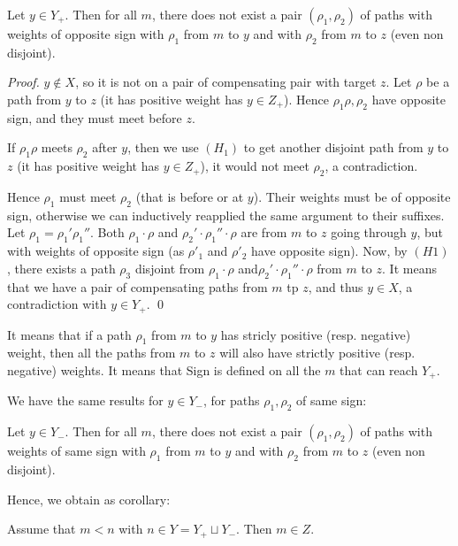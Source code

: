 			
\begin{lemma}
	\label{lemma10}
		Let $y \in Y_+$. Then for all $m$, there does not exist a pair $(\rho_1,\rho_2)$ 
		of paths  with weights of opposite sign with $\rho_1$ from $m$ to $y$ and 
		with $\rho_2$ from $m$ to $z$ (even non disjoint).
\end{lemma}

\begin{proof}
  $y \notin X$, so it is not on a pair of compensating pair with target $z$.
  Let $\rho$ be a path from $y$ to $z$ (it has positive weight has $y \in Z_+$).
  Hence $\rho_1 \rho, \rho_2$ have opposite sign, and they must meet before $z$.

  If $\rho_1 \rho$ meets $\rho_2$ after $y$, then we use $(H_1)$ to get another disjoint path from $y$ to $z$ (it has positive weight has $y \in Z_+$), it would not meet $\rho_2$, a contradiction.

  Hence $\rho_1$ must meet $\rho_2$ (that is before or at $y$).
  Their weights must be of opposite sign, otherwise we can inductively reapplied the same argument to their suffixes.
  Let $\rho_1=\rho_1'\rho_1''$.
  Both $\rho_1 \cdot \rho$ and $\rho_2' \cdot \rho_1'' \cdot \rho$
  are from $m$ to $z$ going through $y$, but with weights of opposite sign (as $\rho'_1$ and $\rho'_2$ have opposite sign).
  Now, by $(H1)$, there exists a path $\rho_3$ disjoint from $\rho_1 \cdot \rho$ and$\rho_2' \cdot \rho_1'' \cdot \rho$ from $m$ to $z$. It means that we have a pair of compensating paths from $m$ tp $z$, and thus $y \in X$, a contradiction with $y \in Y_+$. \qed
\end{proof}

It means that if a path $\rho_1$ from $m$ to $y$ has stricly positive (resp. negative) weight, then all the paths from $m$ to $z$ will also have strictly positive (resp. negative) weights. It means that Sign is defined on all the $m$ that can reach $Y_+$.

We have the same results for $y \in Y_-$, for paths $\rho_1, \rho_2$ of same sign:

\begin{lemma}
	\label{lemma11}
	Let $y \in Y_-$. Then for all $m$, there does not exist a pair $(\rho_1,\rho_2)$ 
	of paths with weights of same sign with $\rho_1$ from $m$ to $y$ and 
	with $\rho_2$ from $m$ to $z$ (even non disjoint).
\end{lemma}

Hence, we obtain as corollary:

\begin{corollary}
\label{cor:simple}
Assume that $m < n$ with $n \in Y= Y_+ \sqcup Y_-$.
Then $m \in Z$.
\end{corollary}

